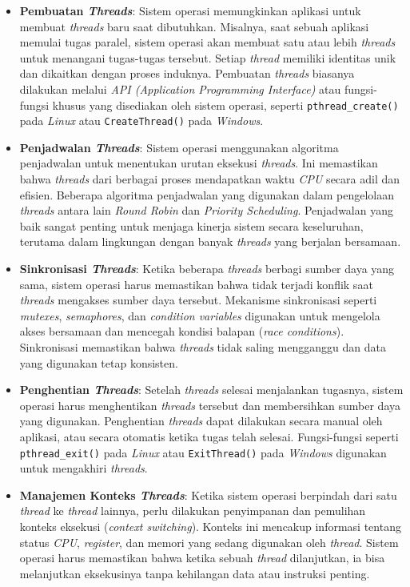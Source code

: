 \documentclass[12pt]{article}
\begin{document}
\begin{itemize}
    \item \textbf{Pembuatan \textit{Threads}}: Sistem operasi memungkinkan aplikasi untuk membuat \textit{threads} baru saat dibutuhkan. Misalnya, saat sebuah aplikasi memulai tugas paralel, sistem operasi akan membuat satu atau lebih \textit{threads} untuk menangani tugas-tugas tersebut. Setiap \textit{thread} memiliki identitas unik dan dikaitkan dengan proses induknya. Pembuatan \textit{threads} biasanya dilakukan melalui \textit{API (Application Programming Interface)} atau fungsi-fungsi khusus yang disediakan oleh sistem operasi, seperti \texttt{pthread\_create()} pada \textit{Linux} atau \texttt{CreateThread()} pada \textit{Windows}.

    \item \textbf{Penjadwalan \textit{Threads}}: Sistem operasi menggunakan algoritma penjadwalan untuk menentukan urutan eksekusi \textit{threads}. Ini memastikan bahwa \textit{threads} dari berbagai proses mendapatkan waktu \textit{CPU} secara adil dan efisien. Beberapa algoritma penjadwalan yang digunakan dalam pengelolaan \textit{threads} antara lain \textit{Round Robin} dan \textit{Priority Scheduling}. Penjadwalan yang baik sangat penting untuk menjaga kinerja sistem secara keseluruhan, terutama dalam lingkungan dengan banyak \textit{threads} yang berjalan bersamaan.

    \item \textbf{Sinkronisasi \textit{Threads}}: Ketika beberapa \textit{threads} berbagi sumber daya yang sama, sistem operasi harus memastikan bahwa tidak terjadi konflik saat \textit{threads} mengakses sumber daya tersebut. Mekanisme sinkronisasi seperti \textit{mutexes}, \textit{semaphores}, dan \textit{condition variables} digunakan untuk mengelola akses bersamaan dan mencegah kondisi balapan (\textit{race conditions}). Sinkronisasi memastikan bahwa \textit{threads} tidak saling mengganggu dan data yang digunakan tetap konsisten.

    \item \textbf{Penghentian \textit{Threads}}: Setelah \textit{threads} selesai menjalankan tugasnya, sistem operasi harus menghentikan \textit{threads} tersebut dan membersihkan sumber daya yang digunakan. Penghentian \textit{threads} dapat dilakukan secara manual oleh aplikasi, atau secara otomatis ketika tugas telah selesai. Fungsi-fungsi seperti \texttt{pthread\_exit()} pada \textit{Linux} atau \texttt{ExitThread()} pada \textit{Windows} digunakan untuk mengakhiri \textit{threads}.

    \item \textbf{Manajemen Konteks \textit{Threads}}: Ketika sistem operasi berpindah dari satu \textit{thread} ke \textit{thread} lainnya, perlu dilakukan penyimpanan dan pemulihan konteks eksekusi (\textit{context switching}). Konteks ini mencakup informasi tentang status \textit{CPU}, \textit{register}, dan memori yang sedang digunakan oleh \textit{thread}. Sistem operasi harus memastikan bahwa ketika sebuah \textit{thread} dilanjutkan, ia bisa melanjutkan eksekusinya tanpa kehilangan data atau instruksi penting.
\end{itemize}
\end{document}
